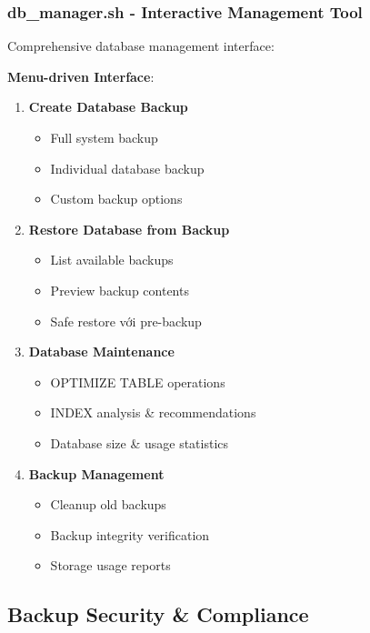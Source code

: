 \documentclass[12pt,a4paper]{article}
\begin{document}
\subsubsection{db\_manager.sh - Interactive Management Tool}
Comprehensive database management interface:

\textbf{Menu-driven Interface}:
\begin{enumerate}
    \item \textbf{Create Database Backup}
       \begin{itemize}
           \item Full system backup
           \item Individual database backup
           \item Custom backup options
       \end{itemize}
    
    \item \textbf{Restore Database from Backup}
       \begin{itemize}
           \item List available backups
           \item Preview backup contents
           \item Safe restore với pre-backup
       \end{itemize}
    
    \item \textbf{Database Maintenance}
       \begin{itemize}
           \item OPTIMIZE TABLE operations
           \item INDEX analysis \& recommendations
           \item Database size \& usage statistics
       \end{itemize}
    
    \item \textbf{Backup Management}
       \begin{itemize}
           \item Cleanup old backups
           \item Backup integrity verification
           \item Storage usage reports
       \end{itemize}
\end{enumerate}

\subsection{Backup Security \& Compliance}
\end{document}
